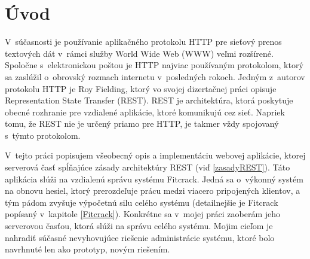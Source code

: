 \documentclass[slovak]{fitthesis}
\begin{document}
  \maketitle
  \setlength{\parskip}{0pt}

  {\hypersetup{hidelinks}\tableofcontents}
  
  \ifczech
    \renewcommand\listfigurename{Seznam obrázků}
  \fi
  \ifslovak
    \renewcommand\listfigurename{Zoznam obrázkov}
  \fi
  
  \ifczech
    \renewcommand\listtablename{Seznam tabulek}
  \fi
  \ifslovak
    \renewcommand\listtablename{Zoznam tabuliek}
  \fi

  \ifODSAZ
    \setlength{\parskip}{0.5\bigskipamount}
  \else
    \setlength{\parskip}{0pt}
  \fi

  \iftwoside
    \cleardoublepage
  \fi


\chapter{Úvod}\label{uvod}
V~súčasnosti je používanie aplikačného protokolu HTTP pre sieťový prenos textových dát v~rámci služby World Wide Web (WWW) veľmi rozšírené. Spoločne s~elektronickou poštou je HTTP najviac používaným protokolom, ktorý sa zaslúžil o~obrovský rozmach internetu v~posledných rokoch. Jedným z~autorov protokolu HTTP je Roy Fielding, ktorý vo svojej dizertačnej práci opisuje Representation State Transfer (REST). REST je architektúra, ktorá poskytuje obecné rozhranie pre vzdialené aplikácie, ktoré komunikujú cez sieť. Napriek tomu, že REST nie je určený priamo pre HTTP, je takmer vždy spojovaný s~týmto protokolom.

V~tejto práci popisujem všeobecný opis a implementáciu webovej aplikácie, ktorej serverová časť spĺňajúce zásady architektúry REST (viď \ref{zasadyREST}). Táto aplikácia slúži na vzdialenú správu systému Fitcrack. Jedná sa o~výkonný systém na obnovu hesiel, ktorý prerozdeľuje prácu medzi viacero pripojených klientov, a tým pádom zvyšuje výpočetnú silu celého systému (detailnejšie je Fitcrack popísaný v~kapitole \ref{Fitcrack}). Konkrétne sa v~mojej práci zaoberám jeho serverovou časťou, ktorá slúži na správu celého systému. Mojim cieľom je nahradiť súčasné nevyhovujúce riešenie administrácie systému, ktoré bolo navrhnuté len ako prototyp, novým riešením.
\end{document}
